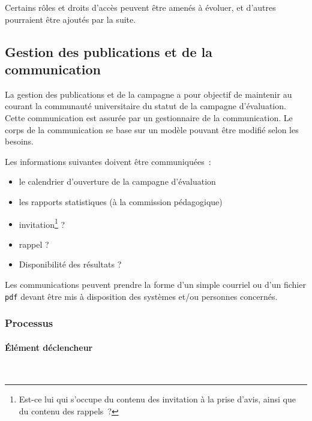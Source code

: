 \documentclass[a4paper,11pt]{report}
\begin{document}
Certains rôles et droits d'accès peuvent être amenés à évoluer, et d'autres pourraient être ajoutés par la suite.






\subsection{Gestion des publications et de la communication}
La gestion des publications et de la campagne a pour objectif de maintenir au courant la communauté universitaire du statut de la campagne d'évaluation.
Cette communication est assurée par un gestionnaire de la communication.
Le corps de la communication se base sur un modèle pouvant être modifié selon les besoins.

\noindent Les informations suivantes doivent être communiquées~:
\begin{itemize}
	\item le calendrier d'ouverture de la campagne d'évaluation
	\item les rapports statistiques (à la commission pédagogique)
	\item invitation\footnote{Est-ce lui qui s'occupe du contenu des invitation à la prise d'avis, ainsi que du contenu des rappels~?} ?
	\item rappel ?
	\item Disponibilité des résultats ?
\end{itemize}

Les communications peuvent prendre la forme d'un simple courriel ou d'un fichier \texttt{pdf} devant être mis à disposition des systèmes et/ou personnes concernés.


\subsubsection{Processus}
\paragraph{Élément déclencheur}~\newline{}

\end{document}
